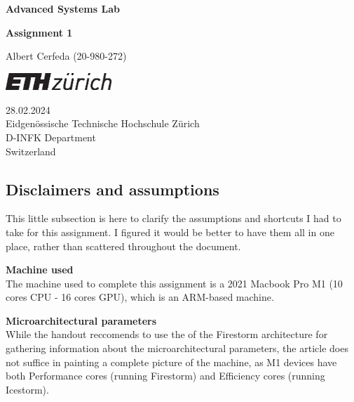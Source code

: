 \documentclass[tikz,14pt,fleqn]{article}
\newcommand\namesurname{Albert Cerfeda (20-980-272)}
\newcommand\assignment{Assignment 1}
\newcommand\subject{Advanced Systems Lab}
\newcommand\documentdate{28.02.2024}
\begin{document}
\begin{titlepage}
   \begin{center}
       \vspace*{0.2cm}

       \textbf{\Large{\subject}}

       \vspace{0.5cm}
        \textbf{\assignment}\\[5mm]
        
            
       \vspace{0.4cm}

        \namesurname
        \begin{figure}[H]
            \centering
        \end{figure}
       \tableofcontents 

       \vspace*{\fill}
     
        \includegraphics[width=0.3\textwidth]{fig/eth_logo_kurz_pos.eps}
       
        \documentdate \\ 
        Eidgenössische Technische Hochschule Zürich\\
        D-INFK Department\\
        Switzerland\\

   \end{center}
\end{titlepage}

\renewcommand{\thesubsubsection}{\alph{subsubsection})}
\setcounter{section}{1}
\setcounter{subsection}{-1}
\subsection{Disclaimers and assumptions}
This little subsection is here to clarify the assumptions and shortcuts I had to take for this assignment. I figured it would be better to have them all in one place, rather than scattered throughout the document.

\textbf{Machine used}\\
The machine used to complete this assignment is a 2021 Macbook Pro M1 (10 cores CPU - 16 cores GPU), which is an ARM-based machine. 

\textbf{Microarchitectural parameters}\\
While the handout reccomends to use the  of the Firestorm architecture for gathering information about the microarchitectural parameters, the article does not suffice in painting a complete picture of the machine, as M1 devices have both Performance cores (running Firestorm) and Efficiency cores (running Icestorm).
\end{document}
